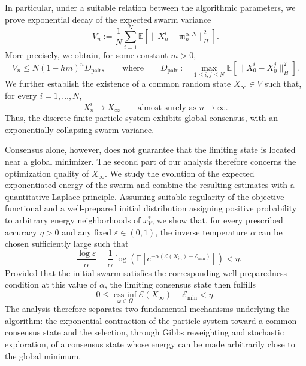 \documentclass[12pt]{amsart}
\DeclareMathOperator*{\essinf}{ess-inf}
\numberwithin{equation}{section}
\begin{document}
In particular, under a suitable relation between the algorithmic parameters, we prove exponential decay of the expected swarm variance
\begin{equation*}
    V_n:=\frac{1}{N}\sum_{i=1}^N\mathbb{E}\left[\|X_n^i-\mathfrak{m}_n^{\alpha,N}\|_H^2\right].
\end{equation*}
More precisely, we obtain, for some constant $m>0$,
\begin{equation*}
    V_n\leq N(1-hm)^nD_{\mathrm{pair}},
    \qquad \text{where} \qquad
    D_{\mathrm{pair}}:=\max_{1\leq i,j\leq N}\mathbb{E}\left[\|X_0^i-X_0^j\|_H^2\right].
\end{equation*}
We further establish the existence of a common random state $X_\infty\in V$ such that, for every $i=1,\ldots,N$,
\begin{equation*}
    X_n^i\longrightarrow X_\infty \qquad \text{almost surely as } n\to\infty.
\end{equation*}
Thus, the discrete finite-particle system exhibits global consensus, with an exponentially collapsing swarm variance.

Consensus alone, however, does not guarantee that the limiting state is located near a global minimizer. The second part of our analysis therefore concerns the optimization quality of $X_\infty$. We study the evolution of the expected exponentiated energy of the swarm and combine the resulting estimates with a quantitative Laplace principle. Assuming suitable regularity of the objective functional and a well-prepared initial distribution assigning positive probability to arbitrary energy neighborhoods of $x_V^*$, we show that, for every prescribed accuracy $\eta>0$ and any fixed $\varepsilon\in(0,1)$, the inverse temperature $\alpha$ can be chosen sufficiently large such that
\begin{equation*}
    -\frac{\log\varepsilon}{\alpha}-\frac{1}{\alpha}\log\left(\mathbb{E}\left[e^{-\alpha(\mathscr{E}(X_{in})-\mathscr{E}_{\min})}\right]\right)<\eta.
\end{equation*}
Provided that the initial swarm satisfies the corresponding well-preparedness condition at this value of $\alpha$, the limiting consensus state then fulfills
\begin{equation*}
    0\leq \essinf\limits_{\omega\in\Omega}\mathscr{E}(X_\infty)-\mathscr{E}_{\min}<\eta.
\end{equation*}
The analysis therefore separates two fundamental mechanisms underlying the algorithm: the exponential contraction of the particle system toward a common consensus state and the selection, through Gibbs reweighting and stochastic exploration, of a consensus state whose energy can be made arbitrarily close to the global minimum.
\end{document}
